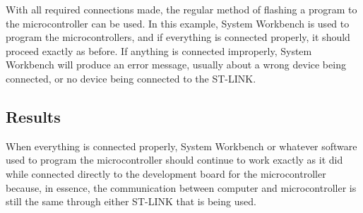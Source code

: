 \documentclass{article}
\begin{document}
  With all required connections made, the regular method of flashing a program
  to the microcontroller can be used. In this example, System Workbench is used
  to program the microcontrollers, and if everything is connected properly, it
  should proceed exactly as before. If anything is connected improperly, System
  Workbench will produce an error message, usually about a wrong device being
  connected, or no device being connected to the ST-LINK.

  \clearpage

  \subsection{Results}

  When everything is connected properly, System Workbench or whatever software
  used to program the microcontroller should continue to work exactly as it did
  while connected directly to the development board for the microcontroller
  because, in essence, the communication between computer and microcontroller is
  still the same through either ST-LINK that is being used.
\end{document}
